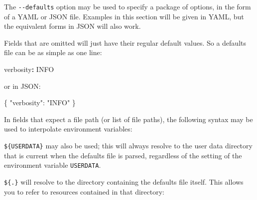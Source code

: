 \documentclass[
]{article}
\newenvironment{Shaded}{}{}
\newcommand{\AttributeTok}[1]{\textcolor[rgb]{0.49,0.56,0.16}{#1}}
\newcommand{\CommentTok}[1]{\textcolor[rgb]{0.38,0.63,0.69}{\textit{#1}}}
\newcommand{\DataTypeTok}[1]{\textcolor[rgb]{0.56,0.13,0.00}{#1}}
\newcommand{\FunctionTok}[1]{\textcolor[rgb]{0.02,0.16,0.49}{#1}}
\newcommand{\KeywordTok}[1]{\textcolor[rgb]{0.00,0.44,0.13}{\textbf{#1}}}
\newcommand{\StringTok}[1]{\textcolor[rgb]{0.25,0.44,0.63}{#1}}
\begin{document}
The \texttt{-\/-defaults} option may be used to specify a package of
options, in the form of a YAML or JSON file. Examples in this section
will be given in YAML, but the equivalent forms in JSON will also work.

Fields that are omitted will just have their regular default values. So
a defaults file can be as simple as one line:

\begin{Shaded}
\begin{Highlighting}[]
\FunctionTok{verbosity}\KeywordTok{:}\AttributeTok{ INFO}
\end{Highlighting}
\end{Shaded}

or in JSON:

\begin{Shaded}
\begin{Highlighting}[]
\FunctionTok{\{} \DataTypeTok{"verbosity"}\FunctionTok{:} \StringTok{"INFO"} \FunctionTok{\}}
\end{Highlighting}
\end{Shaded}

In fields that expect a file path (or list of file paths), the following
syntax may be used to interpolate environment variables:

\begin{Shaded}
\end{Shaded}

\texttt{\$\{USERDATA\}} may also be used; this will always resolve to
the user data directory that is current when the defaults file is
parsed, regardless of the setting of the environment variable
\texttt{USERDATA}.

\texttt{\$\{.\}} will resolve to the directory containing the defaults
file itself. This allows you to refer to resources contained in that
directory:

\begin{Shaded}
\end{Shaded}
\end{document}
